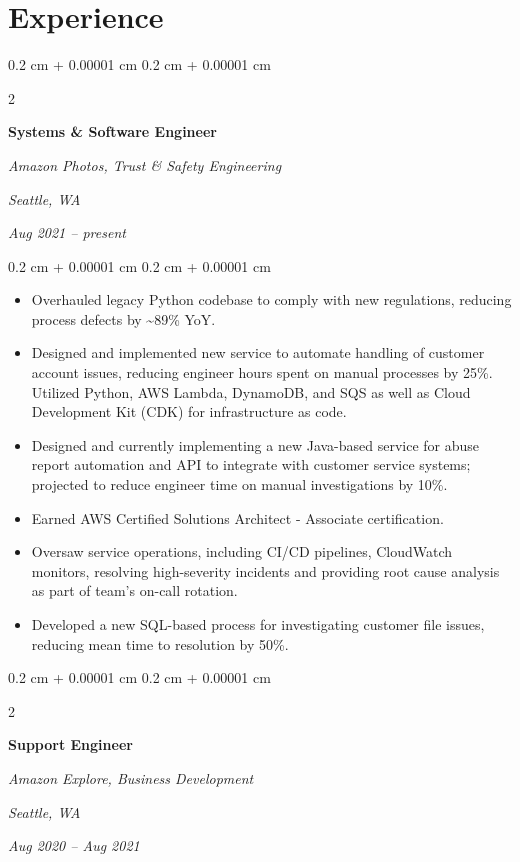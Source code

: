 \documentclass[10pt, letterpaper]{article}
\newenvironment{highlights}{
    \begin{itemize}[
        topsep=0.10 cm,
        parsep=0.10 cm,
        partopsep=0pt,
        itemsep=0pt,
        leftmargin=0.4 cm + 10pt
    ]
}{
    \end{itemize}
} %
\newenvironment{onecolentry}{
    \begin{adjustwidth}{
        0.2 cm + 0.00001 cm
    }{
        0.2 cm + 0.00001 cm
    }
}{
    \end{adjustwidth}
} %
\newenvironment{twocolentry}[2][]{
    \onecolentry
    \def\secondColumn{#2}
    \setcolumnwidth{\fill, 4.5 cm}
    \begin{paracol}{2}
}{
    \switchcolumn \raggedleft \secondColumn
    \end{paracol}
    \endonecolentry
} %
\begin{document}
    
    \section{Experience}



        
        \begin{twocolentry}{
        \textit{Seattle, WA}    
            
        \textit{Aug 2021 – present}}
            \textbf{Systems \& Software Engineer}
            
            \textit{Amazon Photos, Trust \& Safety Engineering}
        \end{twocolentry}

        \vspace{0.10 cm}
        \begin{onecolentry}
            \begin{highlights}
                \item Overhauled legacy Python codebase to comply with new regulations, reducing process defects by \textasciitilde{}89\% YoY.
                \item Designed and implemented new service to automate handling of customer account issues, reducing engineer hours spent on manual processes by 25\%. Utilized Python, AWS Lambda, DynamoDB, and SQS as well as Cloud Development Kit (CDK) for infrastructure as code.
                \item Designed and currently implementing a new Java-based service for abuse report automation and API to integrate with customer service systems; projected to reduce engineer time on manual investigations by 10\%.
                \item Earned AWS Certified Solutions Architect - Associate certification.
                \item Oversaw service operations, including CI/CD pipelines, CloudWatch monitors, resolving high-severity incidents and providing root cause analysis as part of team’s on-call rotation.
                \item Developed a new SQL-based process for investigating customer file issues, reducing mean time to resolution by 50\%.
            \end{highlights}
        \end{onecolentry}


        \vspace{0.2 cm}

        \begin{twocolentry}{
        \textit{Seattle, WA}    
            
        \textit{Aug 2020 – Aug 2021}}
            \textbf{Support Engineer}
            
            \textit{Amazon Explore, Business Development}
        \end{twocolentry}
\end{document}
